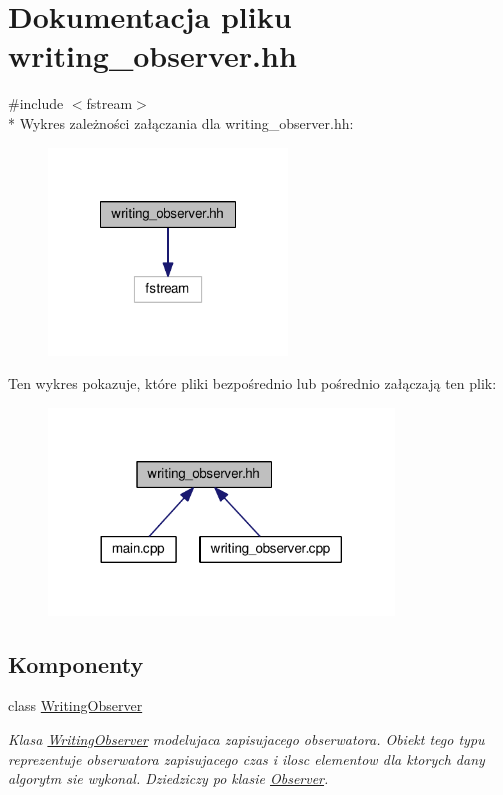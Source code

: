 \hypertarget{writing__observer_8hh}{\section{Dokumentacja pliku writing\-\_\-observer.\-hh}
\label{writing__observer_8hh}
}
{\ttfamily \#include $<$fstream$>$}\\*
Wykres zależności załączania dla writing\-\_\-observer.\-hh\-:\nopagebreak
\begin{figure}[H]
\begin{center}
\leavevmode
\includegraphics[width=180pt]{writing__observer_8hh__incl}
\end{center}
\end{figure}
Ten wykres pokazuje, które pliki bezpośrednio lub pośrednio załączają ten plik\-:\nopagebreak
\begin{figure}[H]
\begin{center}
\leavevmode
\includegraphics[width=260pt]{writing__observer_8hh__dep__incl}
\end{center}
\end{figure}
\subsection*{Komponenty}
\begin{DoxyCompactItemize}
\item 
class \hyperlink{class_writing_observer}{Writing\-Observer}
\begin{DoxyCompactList}\small\item\em Klasa \hyperlink{class_writing_observer}{Writing\-Observer} modelujaca zapisujacego obserwatora. Obiekt tego typu reprezentuje obserwatora zapisujacego czas i ilosc elementow dla ktorych dany algorytm sie wykonal. Dziedziczy po klasie \hyperlink{class_observer}{Observer}. \end{DoxyCompactList}\end{DoxyCompactItemize}
